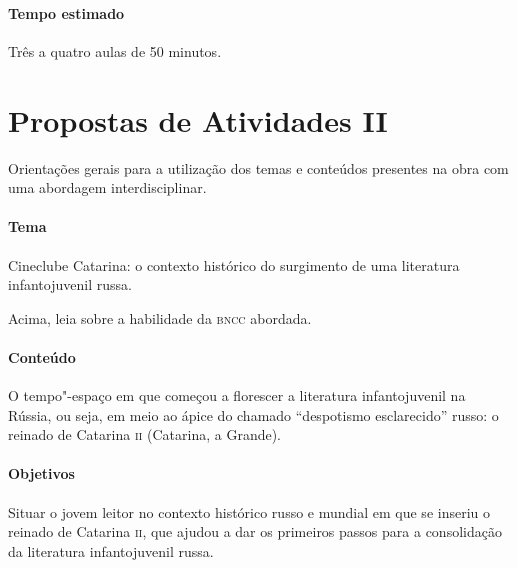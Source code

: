 \documentclass[11pt]{extarticle}
\begin{document}
\paragraph{Tempo estimado} Três a quatro aulas de 50 minutos.

\section{Propostas de Atividades II}

Orientações gerais para a utilização dos temas e conteúdos
presentes na obra com uma abordagem interdisciplinar.

\paragraph{Tema} Cineclube Catarina: o contexto histórico do
surgimento de uma literatura infantojuvenil russa.

Acima, leia sobre a habilidade da \textsc{bncc} abordada.

\paragraph{Conteúdo}
O tempo"-espaço em que começou a florescer a literatura infantojuvenil na
Rússia, ou seja, em meio ao ápice do chamado ``despotismo esclarecido''
russo: o reinado de Catarina \textsc{ii} (Catarina, a Grande).

\paragraph{Objetivos}
Situar o jovem leitor no contexto histórico russo e mundial em que se
inseriu o reinado de Catarina \textsc{ii}, que ajudou a dar os primeiros passos
para a consolidação da literatura infantojuvenil russa.
\end{document}
